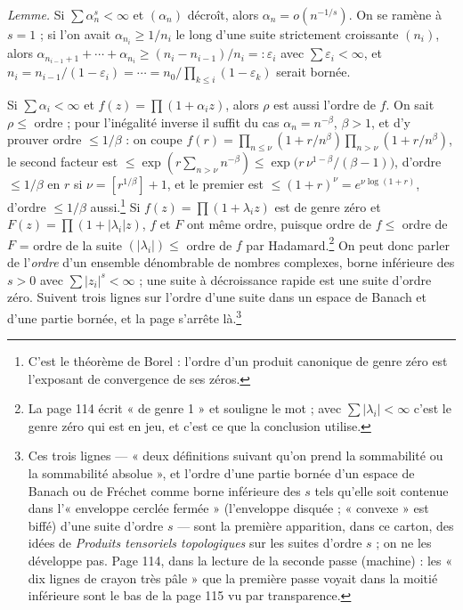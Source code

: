 \documentclass[11pt,a4paper]{article}
\begin{document}
\emph{Lemme.} Si $\sum \alpha_n^s < \infty$ et $(\alpha_n)$ décroît, alors
$\alpha_n = o(n^{-1/s})$. On se ramène à $s = 1$ ; si l'on avait
$\alpha_{n_i} \geq 1/n_i$ le long d'une suite strictement croissante
$(n_i)$, alors $\alpha_{n_{i-1}+1} + \cdots + \alpha_{n_i} \geq (n_i -
n_{i-1})/n_i =: \varepsilon_i$ avec $\sum \varepsilon_i < \infty$, et $n_i =
n_{i-1}/(1 - \varepsilon_i) = \cdots = n_0/\prod_{k \leq i}(1 - \varepsilon_k)$
serait bornée.

Si $\sum \alpha_i < \infty$ et $f(z) = \prod (1 + \alpha_i z)$, alors $\rho$
est aussi l'ordre de $f$. On sait $\rho \leq$ ordre ; pour l'inégalité
inverse il suffit du cas $\alpha_n = n^{-\beta}$, $\beta > 1$, et d'y
prouver ordre $\leq 1/\beta$ : on coupe $f(r) = \prod_{n \leq \nu}(1 +
r/n^\beta)\prod_{n > \nu}(1 + r/n^\beta)$, le second facteur est $\leq
\exp(r\sum_{n > \nu} n^{-\beta}) \leq \exp\bigl(r\,\nu^{1-\beta}/(\beta -
1)\bigr)$, d'ordre $\leq 1/\beta$ en $r$ si $\nu = [r^{1/\beta}] + 1$, et le
premier est $\leq (1+r)^\nu = e^{\nu\log(1+r)}$, d'ordre $\leq 1/\beta$
aussi.\footnote{C'est le théorème de Borel : l'ordre d'un produit canonique
de genre zéro est l'exposant de convergence de ses zéros.} Si $f(z) =
\prod(1 + \lambda_i z)$ est de genre zéro et $F(z) = \prod(1 + |\lambda_i|z)$,
$f$ et $F$ ont même ordre, puisque ordre de $f \leq$ ordre de $F$ = ordre de
la suite $(|\lambda_i|) \leq$ ordre de $f$ par Hadamard.\footnote{La page
114 écrit « de genre 1 » et souligne le mot ; avec $\sum|\lambda_i| < \infty$
c'est le genre zéro qui est en jeu, et c'est ce que la conclusion utilise.}
On peut donc parler de l'\emph{ordre} d'un ensemble dénombrable de nombres
complexes, borne inférieure des $s > 0$ avec $\sum |z_i|^s < \infty$ ; une
suite à décroissance rapide est une suite d'ordre zéro. Suivent trois
lignes sur l'ordre d'une suite dans un espace de Banach et d'une partie
bornée, et la page s'arrête là.\footnote{Ces trois lignes ---
« deux définitions suivant qu'on prend la sommabilité ou la sommabilité
absolue », et l'ordre d'une partie bornée d'un espace de Banach ou de
Fréchet comme borne inférieure des $s$ tels qu'elle soit contenue dans
l'« enveloppe cerclée fermée » (l'enveloppe disquée ; « convexe » est biffé)
d'une suite d'ordre $s$ --- sont la première apparition, dans ce carton, des
idées de \emph{Produits tensoriels topologiques} sur les suites d'ordre $s$ ;
on ne les développe pas. Page 114, dans la lecture de la seconde passe
(machine) : les « dix lignes de crayon très pâle » que la première passe
voyait dans la moitié inférieure sont le bas de la page 115 vu par
transparence.}
\end{document}
